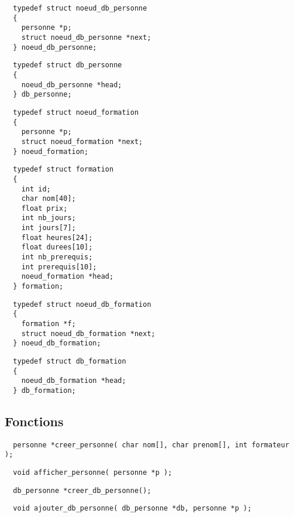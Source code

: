 \documentclass[11pt]{article}
\begin{document}
\begin{lstlisting}
  typedef struct noeud_db_personne
  {
    personne *p;
    struct noeud_db_personne *next;
  } noeud_db_personne;
\end{lstlisting}

\begin{lstlisting}
  typedef struct db_personne
  {
    noeud_db_personne *head;
  } db_personne;
\end{lstlisting}

\begin{lstlisting}
  typedef struct noeud_formation
  {
    personne *p;
    struct noeud_formation *next;
  } noeud_formation;
\end{lstlisting}

\begin{lstlisting}
  typedef struct formation
  {
    int id;
    char nom[40];
    float prix;
    int nb_jours;
    int jours[7];
    float heures[24];
    float durees[10];
    int nb_prerequis;
    int prerequis[10];
    noeud_formation *head;
  } formation;
\end{lstlisting}

\begin{lstlisting}
  typedef struct noeud_db_formation
  {
    formation *f;
    struct noeud_db_formation *next;
  } noeud_db_formation;
\end{lstlisting}

\begin{lstlisting}
  typedef struct db_formation
  {
    noeud_db_formation *head;
  } db_formation;
\end{lstlisting}

\newpage
\subsection{Fonctions}

\begin{lstlisting}
  personne *creer_personne( char nom[], char prenom[], int formateur );
\end{lstlisting}

\begin{lstlisting}
  void afficher_personne( personne *p );
\end{lstlisting}

\begin{lstlisting}
  db_personne *creer_db_personne();
\end{lstlisting}

\begin{lstlisting}
  void ajouter_db_personne( db_personne *db, personne *p );
\end{lstlisting}
\end{document}
